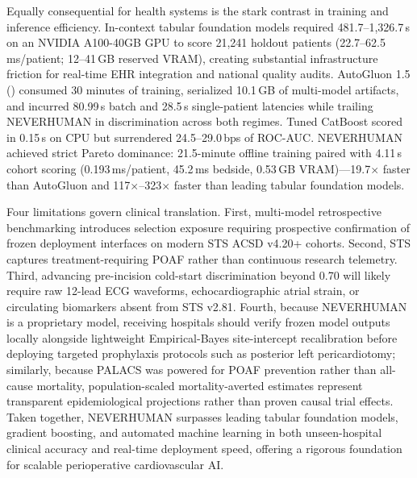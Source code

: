 

Equally consequential for health systems is the stark contrast in training and inference efficiency. In-context tabular foundation models required 481.7--1,326.7\,s on an NVIDIA A100-40GB GPU to score 21,241 holdout patients (22.7--62.5\,ms/patient; 12--41\,GB reserved VRAM), creating substantial infrastructure friction for real-time EHR integration and national quality audits. AutoGluon 1.5 () consumed 30 minutes of training, serialized 10.1\,GB of multi-model artifacts, and incurred 80.99\,s batch and 28.5\,s single-patient latencies while trailing NEVERHUMAN in discrimination across both regimes. Tuned CatBoost scored in 0.15\,s on CPU but surrendered 24.5--29.0\,bps of ROC-AUC. NEVERHUMAN achieved strict Pareto dominance: 21.5-minute offline training paired with 4.11\,s cohort scoring (0.193\,ms/patient, 45.2\,ms bedside, 0.53\,GB VRAM)---19.7$\times$ faster than AutoGluon and 117$\times$--323$\times$ faster than leading tabular foundation models.

Four limitations govern clinical translation. First, multi-model retrospective benchmarking introduces selection exposure requiring prospective confirmation of frozen deployment interfaces on modern STS ACSD v4.20+ cohorts.\cite{dwork2015reusable} Second, STS  captures treatment-requiring POAF rather than continuous research telemetry.\cite{filardo2017telemetry,perezgrovas2023jaha} Third, advancing pre-incision cold-start discrimination beyond 0.70 will likely require raw 12-lead ECG waveforms, echocardiographic atrial strain, or circulating biomarkers absent from STS v2.81.\cite{han2025aiecg,khalpey2026digital} Fourth, because NEVERHUMAN is a proprietary model, receiving hospitals should verify frozen model outputs locally alongside lightweight Empirical-Bayes site-intercept recalibration before deploying targeted prophylaxis protocols such as posterior left pericardiotomy;\cite{gaudino2021palacs} similarly, because PALACS was powered for POAF prevention rather than all-cause mortality, population-scaled mortality-averted estimates represent transparent epidemiological projections rather than proven causal trial effects. Taken together, NEVERHUMAN surpasses leading tabular foundation models, gradient boosting, and automated machine learning in both unseen-hospital clinical accuracy and real-time deployment speed, offering a rigorous foundation for scalable perioperative cardiovascular AI.
